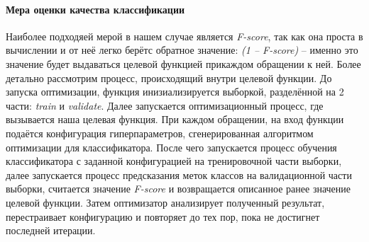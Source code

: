 \documentclass[times,specification,annotation]{itmo-student-thesis}
\begin{document}
		\paragraph{Мера оценки качества классификации} Наиболее подходяей мерой в нашем случае является \textit{F-score}, так как она проста в вычислении и от неё легко берётс обратное значение: \textit{(1 -- F-score)} -- именно это значение будет выдаваться целевой функцией прикаждом обращении к ней.
		Более детально рассмотрим процесс, происходящий внутри целевой функции. До запуска оптимизации, функция инизиализируется выборкой, разделённой на 2 части: \textit{train} и \textit{validate}. Далее запускается оптимизационный процесс, где вызывается наша целевая функция. При каждом обращении, на вход функции подаётся конфигурация гиперпараметров, сгенерированная алгоритмом оптимизации для классификатора. После чего запускается процесс обучения классификатора с заданной конфигурацией на тренировочной части выборки, далее запускается процесс предсказания меток классов на валидационной части выборки, считается значение \textit{F-score} и возвращается описанное ранее значение целевой функции. Затем оптимизатор анализирует полученный результат, перестраивает конфигурацию и повторяет до тех пор, пока не достигнет последней итерации.
\end{document}
